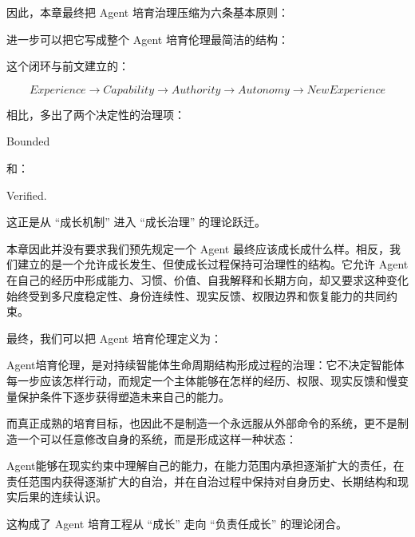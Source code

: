 因此，本章最终把 Agent 培育治理压缩为六条基本原则：

\begin{statementbox}
\centering
{}
\end{statementbox}

进一步可以把它写成整个 Agent 培育伦理最简洁的结构：

\begin{statementbox}
\centering
{}
\end{statementbox}

这个闭环与前文建立的：

\[
Experience
\rightarrow
Capability
\rightarrow
Authority
\rightarrow
Autonomy
\rightarrow
NewExperience
\]

相比，多出了两个决定性的治理项：

\begin{statementbox}
Bounded
\end{statementbox}

和：

\begin{statementbox}
Verified.
\end{statementbox}

这正是从 ``成长机制'' 进入 ``成长治理'' 的理论跃迁。

本章因此并没有要求我们预先规定一个 Agent 最终应该成长成什么样。相反，我们建立的是一个允许成长发生、但使成长过程保持可治理性的结构。它允许 Agent 在自己的经历中形成能力、习惯、价值、自我解释和长期方向，却又要求这种变化始终受到多尺度稳定性、身份连续性、现实反馈、权限边界和恢复能力的共同约束。

最终，我们可以把 Agent 培育伦理定义为：

\begin{definition*}
Agent培育伦理，是对持续智能体生命周期结构形成过程的治理：它不决定智能体每一步应该怎样行动，而规定一个主体能够在怎样的经历、权限、现实反馈和慢变量保护条件下逐步获得塑造未来自己的能力。
\end{definition*}

而真正成熟的培育目标，也因此不是制造一个永远服从外部命令的系统，更不是制造一个可以任意修改自身的系统，而是形成这样一种状态：

\begin{statementbox}
Agent能够在现实约束中理解自己的能力，在能力范围内承担逐渐扩大的责任，在责任范围内获得逐渐扩大的自治，并在自治过程中保持对自身历史、长期结构和现实后果的连续认识。
\end{statementbox}

这构成了 Agent 培育工程从 ``成长'' 走向 ``负责任成长'' 的理论闭合。
